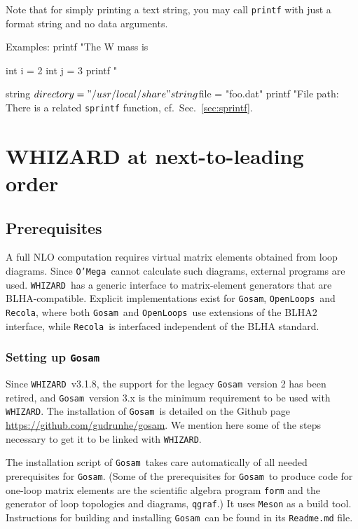 \documentclass[12pt]{book}
\newenvironment{code}%
  {\begingroup\footnotesize
   \quote
   \Verbatim}%
  {\endVerbatim
   \endquote
   \endgroup\noindent}
\newcommand{\ttt}[1]{\texttt{#1}}
\newcommand{\whizard}{\ttt{WHIZARD}}
\newcommand{\oMega}{\ttt{O'Mega}}
\newcommand{\gosam}{\ttt{Gosam}}
\newcommand{\openloops}{\ttt{OpenLoops}}
\newcommand{\recola}{\ttt{Recola}}
\begin{document}
Note that for simply printing a text string, you may call \ttt{printf} with
just a format string and no data arguments.

Examples:
\begin{code}
printf "The W mass is %

int i = 2
int j = 3
printf "%

string $directory = "/usr/local/share"
string $file = "foo.dat"
printf "File path: %
\end{code}
There is a related \ttt{sprintf} function, cf.~Sec.~\ref{sec:sprintf}.


\section{WHIZARD at next-to-leading order}
\subsection{Prerequisites}
A full NLO computation requires virtual matrix elements obtained from
loop diagrams. Since \oMega\ cannot calculate such diagrams, external
programs are used.  \whizard\ has a generic interface to matrix-element
generators that are BLHA-compatible.
Explicit implementations exist for \gosam, \openloops\ and \recola,
where both \gosam\ and \openloops\ use extensions of the BLHA2
interface, while \recola\ is interfaced independent of the BLHA
standard. 


\subsubsection{Setting up \gosam}

Since \whizard\ v3.1.8, the support for the legacy \gosam\ version 2
has been retired, and \gosam\ version 3.x is the minimum requirement
to be used with \whizard. 
The installation of \gosam\ is detailed on the Github page
\url{https://github.com/gudrunhe/gosam}.  We mention here some of the
steps necessary to get it to be linked with \whizard.

The installation script of \gosam\ takes care automatically of all
needed prerequisites for \gosam. (Some of the prerequisites for
\gosam\ to produce code for one-loop matrix elements are the
scientific algebra program \ttt{form} and the generator of loop
topologies and diagrams, \ttt{qgraf}.) It uses \texttt{Meson} as a
build tool. Instructions for building and installing \gosam\ can be
found in its \texttt{Readme.md} file.
\end{document}
